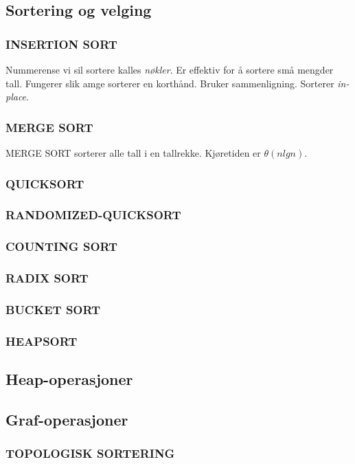 \subsection{Sortering og velging}
\subsubsection{INSERTION SORT}
Nummerense vi sil sortere kalles \textit{nøkler}. Er effektiv for å sortere små mengder tall. Fungerer slik amge sorterer en korthånd. Bruker sammenligning. Sorterer \textit{in-place}.

\subsubsection{MERGE SORT}
MERGE SORT sorterer alle tall i en tallrekke. Kjøretiden er $\theta(n lg n)$.

\subsubsection{QUICKSORT}
\subsubsection{RANDOMIZED-QUICKSORT}
\subsubsection{COUNTING SORT}
\subsubsection{RADIX SORT}
\subsubsection{BUCKET SORT}
\subsubsection{HEAPSORT}
\subsection{Heap-operasjoner}
\subsection{Graf-operasjoner}
\subsubsection{TOPOLOGISK SORTERING}
